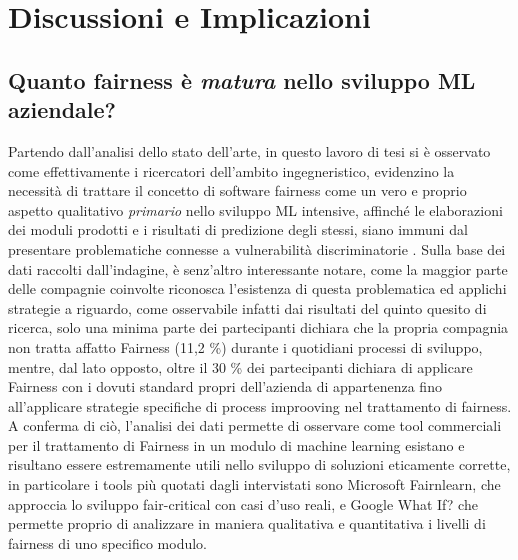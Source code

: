     \section{Discussioni e Implicazioni}
    
    \subsection{Quanto fairness è \emph{matura} nello sviluppo ML aziendale?}
    Partendo dall'analisi dello stato dell'arte, in questo lavoro di tesi si è osservato come effettivamente i ricercatori dell'ambito ingegneristico, evidenzino la necessità di trattare il concetto di software fairness come un vero e proprio aspetto qualitativo \emph{primario} nello sviluppo ML intensive, affinché le elaborazioni dei moduli prodotti e i risultati di predizione degli stessi, siano immuni dal presentare problematiche connesse a vulnerabilità discriminatorie \cite{brun2018software}. Sulla base dei dati raccolti dall'indagine, è senz'altro interessante notare, come la maggior parte delle compagnie coinvolte riconosca l'esistenza di questa problematica ed applichi strategie a riguardo, come osservabile infatti dai risultati del quinto quesito di ricerca, solo una minima parte dei partecipanti dichiara che la propria compagnia non tratta affatto Fairness (11,2 \%) durante i quotidiani processi di sviluppo, mentre, dal lato opposto, oltre il 30 \% dei partecipanti dichiara di 
    applicare Fairness con i dovuti standard propri dell'azienda di appartenenza fino all'applicare strategie specifiche di process improoving nel trattamento di fairness. A conferma di ciò, l'analisi dei dati permette di osservare come tool commerciali per il trattamento di Fairness in un modulo di machine learning esistano e risultano essere estremamente utili nello sviluppo di soluzioni eticamente corrette, in particolare i tools più quotati dagli intervistati sono  Microsoft Fairnlearn, che approccia lo sviluppo fair-critical con casi d'uso reali, e Google What If? che permette proprio di analizzare in maniera qualitativa e quantitativa i livelli di fairness di uno specifico modulo.\\
    
